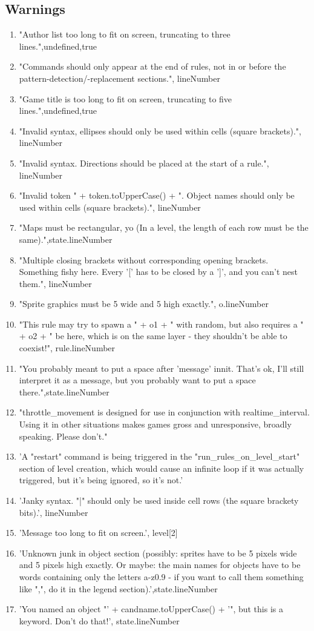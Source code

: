 \subsection{Warnings}
\begin{enumerate}
    \item "Author list too long to fit on screen, truncating to three lines.",undefined,true
    \item "Commands should only appear at the end of rules, not in or before the pattern-detection/-replacement sections.", lineNumber
    \item "Game title is too long to fit on screen, truncating to five lines.",undefined,true
    \item "Invalid syntax, ellipses should only be used within cells (square brackets).", lineNumber
    \item "Invalid syntax. Directions should be placed at the start of a rule.", lineNumber
    \item "Invalid token " + token.toUpperCase() + ". Object names should only be used within cells (square brackets).", lineNumber
    \item "Maps must be rectangular, yo (In a level, the length of each row must be the same).",state.lineNumber
    \item "Multiple closing brackets without corresponding opening brackets.  Something fishy here.  Every '[' has to be closed by a ']', and you can't nest them.", lineNumber
    \item "Sprite graphics must be 5 wide and 5 high exactly.", o.lineNumber
    \item "This rule may try to spawn a " + o1 + " with random, but also requires a " + o2 + " be here, which is on the same layer - they shouldn't be able to coexist!", rule.lineNumber
    \item "You probably meant to put a space after 'message' innit.  That's ok, I'll still interpret it as a message, but you probably want to put a space there.",state.lineNumber
    \item "throttle\_movement is designed for use in conjunction with realtime\_interval. Using it in other situations makes games gross and unresponsive, broadly speaking.  Please don't."
    \item 'A "restart" command is being triggered in the "run\_rules\_on\_level\_start" section of level creation, which would cause an infinite loop if it was actually triggered, but it's being ignored, so it's not.'
    \item 'Janky syntax.  "|" should only be used inside cell rows (the square brackety bits).', lineNumber
    \item 'Message too long to fit on screen.', level[2]
    \item 'Unknown junk in object section (possibly: sprites have to be 5 pixels wide and 5 pixels high exactly. Or maybe: the main names for objects have to be words containing only the letters a-z0.9 - if you want to call them something like ",", do it in the legend section).',state.lineNumber
    \item 'You named an object "' + candname.toUpperCase() + '", but this is a keyword. Don't do that!', state.lineNumber
\end{enumerate}

